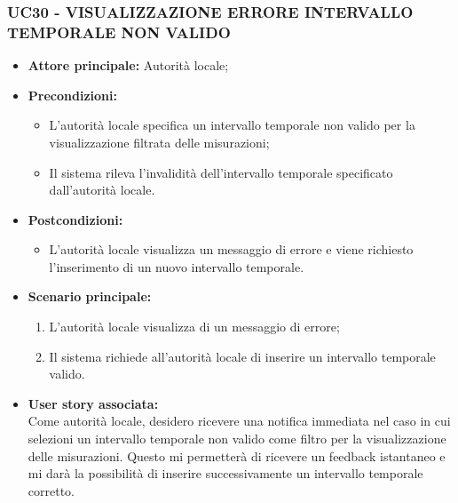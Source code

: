 \subsubsection{UC30 - VISUALIZZAZIONE ERRORE INTERVALLO TEMPORALE NON VALIDO}
\begin{itemize}
      \item \textbf{Attore principale:} Autorità locale;
      \item \textbf{Precondizioni:}
            \begin{itemize} 
                  \item L'autorità locale specifica un intervallo temporale non valido per la visualizzazione filtrata delle misurazioni;
                  \item Il sistema rileva l'invalidità dell'intervallo temporale specificato dall'autorità locale.
            \end{itemize}
      \item \textbf{Postcondizioni:}
            \begin{itemize}
                  \item L'autorità locale visualizza un messaggio di errore e viene richiesto l'inserimento di un nuovo intervallo temporale.
            \end{itemize}
      \item \textbf{Scenario principale:}
                  \begin{enumerate}
                  \item L'autorità locale visualizza di un messaggio di errore;
                  \item Il sistema richiede all'autorità locale di inserire un intervallo temporale valido.
                  \end{enumerate}
      \item \textbf{User story associata:} \\
            Come autorità locale, desidero ricevere una notifica immediata nel caso in cui selezioni un intervallo temporale non valido come filtro per la visualizzazione delle misurazioni. Questo mi permetterà di ricevere un feedback istantaneo e mi darà la possibilità di inserire successivamente un intervallo temporale corretto.
\end{itemize}